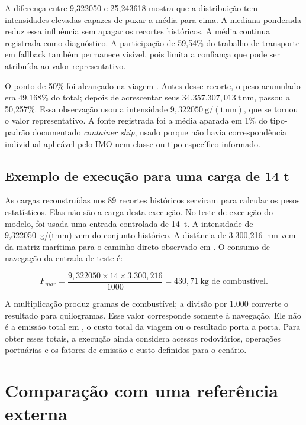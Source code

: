 A diferença entre 9,322050 e 25,243618 mostra que a distribuição tem intensidades elevadas capazes de puxar a média para cima. A mediana ponderada reduz essa influência sem apagar os recortes históricos. A média continua registrada como diagnóstico. A participação de 59,54\% do trabalho de transporte em fallback também permanece visível, pois limita a confiança que pode ser atribuída ao valor representativo.

O ponto de 50\% foi alcançado na viagem . Antes desse recorte, o peso acumulado era 49,168\% do total; depois de acrescentar seus \(34.357.307{,}013~\mathrm{t\,nm}\), passou a 50,257\%. Essa observação usou a intensidade \(9{,}322050~\mathrm{g/(t\,nm)}\), que se tornou o valor representativo. A fonte registrada foi a média aparada em 1\% do tipo-padrão documentado \emph{container ship}, usado porque não havia correspondência individual aplicável pelo IMO nem classe ou tipo específico informado.

\subsection*{Exemplo de execução para uma carga de 14 t}

As cargas reconstruídas nos 89 recortes históricos serviram para calcular os pesos estatísticos. Elas não são a carga desta execução. No teste de execução do modelo, foi usada uma entrada controlada de 14~t. A intensidade de 9,322050~g/(t$\cdot$nm) vem do conjunto histórico. A distância de 3.300,216~nm vem da matriz marítima para o caminho direto observado em . O consumo de navegação da entrada de teste é:

\begin{equation}
F_{mar} = \frac{9{,}322050 \times 14 \times 3.300{,}216}{1000}
= 430{,}71~\text{kg de combustível}.
\end{equation}

A multiplicação produz gramas de combustível; a divisão por 1.000 converte o resultado para quilogramas. Esse valor corresponde somente à navegação. Ele não é a emissão total em \cooe{}, o custo total da viagem ou o resultado porta a porta. Para obter esses totais, a execução ainda considera acessos rodoviários, operações portuárias e os fatores de emissão e custo definidos para o cenário.

\section{Comparação com uma referência externa}
\label{sec:resultados-benchmark}


